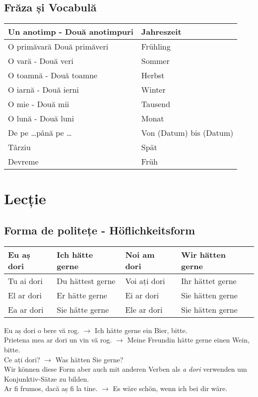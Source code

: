 \documentclass[11pt, oneside]{article}
\begin{document}
\subsection{Frăza și Vocabulă}
\begin{center}
  \begin{tabular}{ | p{6cm}| p{6cm} | } 
    \hline
    Un anotimp - Două anotimpuri & Jahreszeit\\
    \hline
    O primăvară Două primăveri & Frühling\\
    \hline
    O vară - Două veri & Sommer\\
    \hline
    O toamnă - Două toamne & Herbst\\
    \hline
    O iarnă - Două ierni & Winter\\
    \hline
    O mie - Două mii & Tausend\\
    \hline
    O lună - Două luni & Monat\\
    \hline
    De pe \dots până pe \dots & Von (Datum) bis (Datum)\\
    \hline
    Târziu & Spät\\
    \hline
    Devreme & Früh\\
    \hline
  \end{tabular}
\end{center}
%
\newpage
\section{Lecție}

\subsection{Forma de politețe - Höflichkeitsform}
%
\begin{center}
  \begin{tabular}{ |p{3cm}|p{3cm}||p{3cm}|p{3cm}|  }
      \hline
      Eu aș dori & Ich hätte gerne & Noi am dori & Wir hätten gerne\\
      \hline
      Tu ai dori & Du hättest gerne & Voi ați dori & Ihr hättet gerne\\
      \hline
      El ar dori& Er hätte gerne & Ei ar dori & Sie hätten gerne\\ 
      Ea ar dori & Sie hätte gerne & Ele ar dori & Sie hätten gerne\\
      \hline
     \end{tabular}
\end{center}
Eu aș dori o bere vă rog. $\rightarrow$ Ich hätte gerne ein Bier, bitte.\\
Prietena mea ar dori un vin vă rog. $\rightarrow$ Meine Freundin hätte gerne einen Wein, bitte.\\
Ce ați dori? $\rightarrow$ Was hätten Sie gerne?\\
\newline
Wir können diese Form aber auch mit anderen Verben als \emph{a dori} 
verwenden um Konjunktiv-Sätze zu bilden.\\
\newline
Ar fi frumos, dacă aș fi la tine. $\rightarrow$ Es wäre schön, wenn ich bei dir wäre.
%
\end{document}
